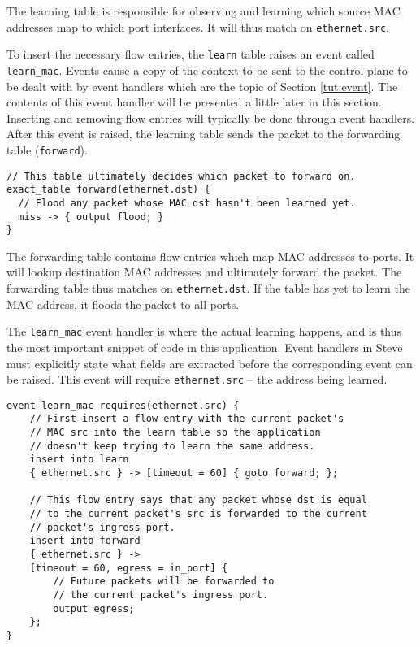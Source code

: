 The learning table is responsible for observing and learning which
source MAC addresses map to which port interfaces.
It will thus match on \texttt{ethernet.src}. 

To insert the necessary flow entries, the \texttt{learn} table raises an event
called \texttt{learn\_mac}. 
Events cause a copy of the context to be sent to the control plane to be dealt with by event handlers which are the topic of Section \ref{tut:event}.
The contents of this event handler will be presented a little later in this section.
Inserting and removing flow entries will typically be done through event handlers.
After this event is raised, the learning table sends the packet to the
forwarding table (\texttt{forward}).

\begin{codepage}
\begin{lstlisting}
// This table ultimately decides which packet to forward on.
exact_table forward(ethernet.dst) {
  // Flood any packet whose MAC dst hasn't been learned yet.
  miss -> { output flood; }
}
\end{lstlisting}
\end{codepage}

The forwarding table contains flow entries which map MAC addresses to ports. It will lookup destination MAC addresses and ultimately forward the packet. The forwarding table thus
matches on \texttt{ethernet.dst}. If the table has yet to learn the MAC address, it floods the packet to all ports.

The \texttt{learn\_mac} event handler is where the actual
learning happens, and is thus the most important snippet of code in this
application. Event handlers in Steve must explicitly state what fields are extracted before the corresponding event can be raised. This event will require \texttt{ethernet.src} -- the address being learned.

\begin{codepage}
\begin{lstlisting}
event learn_mac requires(ethernet.src) {
	// First insert a flow entry with the current packet's 
	// MAC src into the learn table so the application 
	// doesn't keep trying to learn the same address.
	insert into learn
	{ ethernet.src } -> [timeout = 60] { goto forward; };

	// This flow entry says that any packet whose dst is equal
	// to the current packet's src is forwarded to the current 
	// packet's ingress port.
	insert into forward
	{ ethernet.src } ->
	[timeout = 60, egress = in_port] {
		// Future packets will be forwarded to
		// the current packet's ingress port.
		output egress;
	};
}
\end{lstlisting}
\end{codepage}

